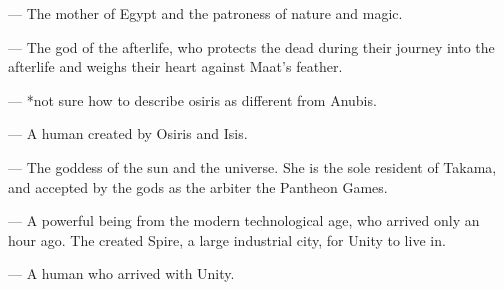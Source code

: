 \documentclass[blue]{guardians}
\begin{document}
\begin{itemz}
  \item \cIsis{} --- The mother of Egypt and the patroness of nature and magic.
  \item \cAnubis{} --- The god of the afterlife, who protects the dead during their journey into the afterlife and weighs their heart against Maat's feather.
  \item \cOsiris{} --- *not sure how to describe osiris as different from Anubis.
  \item \cEgyptianHuman{} --- A human created by Osiris and Isis.
\end{itemz}

\begin{itemz}
  \item \cAmaterasu{} --- The goddess of the sun and the universe. She is the sole resident of Takama, and accepted by the gods as the arbiter the Pantheon Games.
\end{itemz}

\begin{itemz}
  \item\cUnity{} --- A powerful being from the modern technological age, who arrived only an hour ago. The \cCaretaker{} created Spire, a large industrial city, for Unity to live in.
  \item\cKachiko{} --- A human who arrived with Unity.
\end{itemz}
\end{document}
